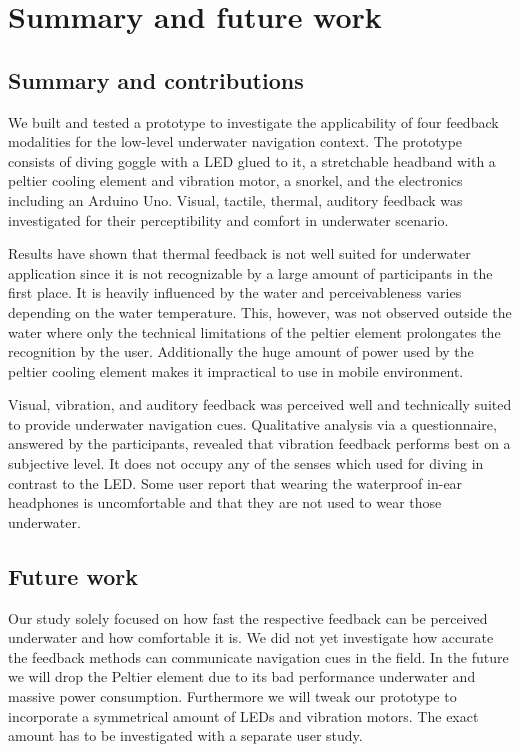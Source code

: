 %

\chapter{Summary and future work}
\label{summaryandfuturework}


\section{Summary and contributions}
\label{summaryandfuturework.summary}

We built and tested a prototype to investigate the applicability of four feedback modalities for the low-level underwater navigation context.
The prototype consists of diving goggle with a LED glued to it, a stretchable headband with a peltier cooling element and vibration motor, a snorkel, and the electronics including an Arduino Uno.
Visual, tactile, thermal, auditory feedback was investigated for their perceptibility and comfort in underwater scenario.

Results have shown that thermal feedback is not well suited for underwater application since it is not recognizable by a large amount of participants in the first place.
It is heavily influenced by the water and perceivableness varies depending on the water temperature.
This, however, was not observed outside the water where only the technical limitations of the peltier element prolongates the recognition by the user.
Additionally the huge amount of power used by the peltier cooling element makes it impractical to use in mobile environment.

Visual, vibration, and auditory feedback was perceived well and technically suited to provide underwater navigation cues.
Qualitative analysis via a questionnaire, answered by the participants, revealed that vibration feedback performs best on a subjective level.
It does not occupy any of the senses which used for diving in contrast to the LED.
Some user report that wearing the waterproof in-ear headphones is uncomfortable and that they are not used to wear those underwater.

\section{Future work}
\label{summaryandfuturework.futurework}
Our study solely focused on how fast the respective feedback can be perceived underwater and how comfortable it is.
We did not yet investigate how accurate the feedback methods can communicate navigation cues in the field.
In the future we will drop the Peltier element due to its bad performance underwater and massive power consumption.
Furthermore we will tweak our prototype to incorporate a symmetrical amount of LEDs and vibration motors.
The exact amount has to be investigated with a separate user study.

